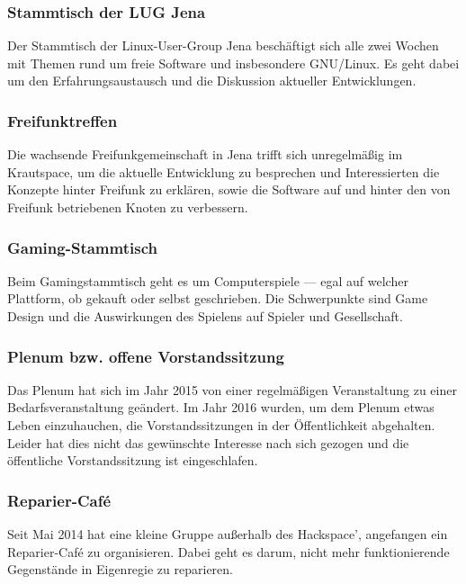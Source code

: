 \documentclass[ngerman]{scrartcl}
\begin{document}
\subsubsection{Stammtisch der LUG Jena}

Der Stammtisch der Linux-User-Group Jena beschäftigt sich alle zwei
Wochen mit Themen rund um freie Software und insbesondere
GNU/Linux. Es geht dabei um den Erfahrungsaustausch und die Diskussion
aktueller Entwicklungen.

\subsubsection{Freifunktreffen}

Die wachsende Freifunkgemeinschaft in Jena trifft sich unregelmäßig im
Krautspace, um die aktuelle Entwicklung zu besprechen und
Interessierten die Konzepte hinter Freifunk zu erklären, sowie die
Software auf und hinter den von Freifunk betriebenen Knoten zu
verbessern.

\subsubsection{Gaming-Stammtisch}

Beim Gamingstammtisch geht es um Computerspiele — egal auf welcher
Plattform, ob gekauft oder selbst geschrieben. Die Schwerpunkte sind
Game Design und die Auswirkungen des Spielens auf Spieler und
Gesellschaft.

\subsubsection{Plenum bzw. offene Vorstandssitzung}

Das Plenum hat sich im Jahr 2015 von einer regelmäßigen Veranstaltung
zu einer Bedarfsveranstaltung geändert. Im Jahr 2016 wurden, um dem
Plenum etwas Leben einzuhauchen, die Vorstandssitzungen in der
Öffentlichkeit abgehalten. Leider hat dies nicht das gewünschte
Interesse nach sich gezogen und die öffentliche Vorstandssitzung ist
eingeschlafen.

\subsubsection{Reparier-Café}

Seit Mai 2014 hat eine kleine Gruppe außerhalb des Hackspace',
angefangen ein Reparier-Café zu organisieren. Dabei geht es darum,
nicht mehr funktionierende Gegenstände in Eigenregie zu reparieren.
\end{document}
